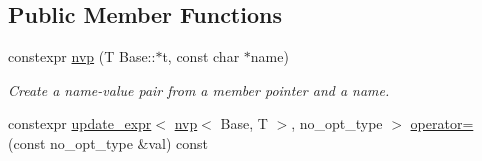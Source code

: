 \subsection*{Public Member Functions}
\begin{DoxyCompactItemize}
\item 
constexpr \hyperlink{classmangrove_1_1nvp_a820f8a196b639e334059c7e80c24b05f}{nvp} (T Base\+::$\ast$t, const char $\ast$name)
\begin{DoxyCompactList}\small\item\em Create a name-\/value pair from a member pointer and a name. \end{DoxyCompactList}\item 
constexpr \hyperlink{classmangrove_1_1update__expr}{update\+\_\+expr}$<$ \hyperlink{classmangrove_1_1nvp}{nvp}$<$ Base, T $>$, no\+\_\+opt\+\_\+type $>$ \hyperlink{classmangrove_1_1nvp_a5544c2e72bbee89d258f60327a86bf9b}{operator=} (const no\+\_\+opt\+\_\+type \&val) const \hypertarget{classmangrove_1_1nvp_a5544c2e72bbee89d258f60327a86bf9b}{}\label{classmangrove_1_1nvp_a5544c2e72bbee89d258f60327a86bf9b}


\end{DoxyCompactItemize}
